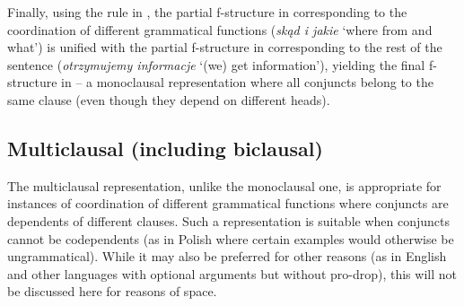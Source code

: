 \documentclass[output=paper]{../langscibook}
\begin{document}
Finally, using the rule in , the partial f-structure
in  corresponding
to the coordination of different grammatical functions (\emph{skąd i
  jakie} `where from and what') is unified with the partial f-structure in
 corresponding to the
rest of the sentence (\emph{otrzymujemy informacje} `(we) get information'), yielding the
final f-structure in 
– a monoclausal representation where all conjuncts belong to the same
clause (even though they depend on different heads).



\subsection{Multiclausal (including biclausal)}
\label{sec:Coordination:lexsem:multi}

The multiclausal representation, unlike the monoclausal one, is appropriate
for instances of coordination of different grammatical functions where
conjuncts are dependents of different clauses. Such a representation is
suitable when conjuncts cannot be codependents (as in Polish where
certain examples would otherwise be ungrammatical). While it may also be
preferred for other reasons (as in English and other
languages with optional arguments but without pro-drop), this will not
be discussed here for reasons of space.
\end{document}
